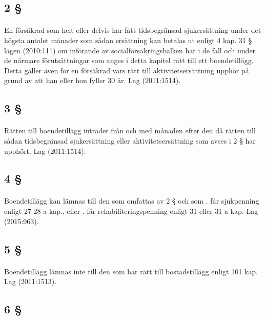 \documentclass[a4paper,notitlepage,openany,10pt]{book}
\begin{document}
\subsection*{2 §}
\paragraph*{}
En försäkrad som helt eller delvis har fått tidsbegränsad sjukersättning under det högsta antalet månader som sådan ersättning kan betalas ut enligt 4 kap. 31 § lagen (2010:111) om införande av socialförsäkringsbalken har i de fall och under de närmare förutsättningar som anges i detta kapitel rätt till ett boendetillägg. Detta gäller även för en försäkrad vars rätt till aktivitetsersättning upphör på grund av att han eller hon fyller 30 år.
Lag (2011:1514).
\subsection*{3 §}
\paragraph*{}
Rätten till boendetillägg inträder från och med månaden efter den då rätten till sådan tidsbegränsad sjukersättning eller aktivitetsersättning som avses i 2 § har upphört.
Lag (2011:1514).
\subsection*{4 §}
\paragraph*{}
Boendetillägg kan lämnas till den som omfattas av 2 § och som
. får sjukpenning enligt 27-28 a kap., eller
. får rehabiliteringspenning enligt 31 eller 31 a kap.
Lag (2015:963).
\subsection*{5 §}
\paragraph*{}
Boendetillägg lämnas inte till den som har rätt till bostadstillägg enligt 101 kap.
Lag (2011:1513).
\subsection*{6 §}
\end{document}
